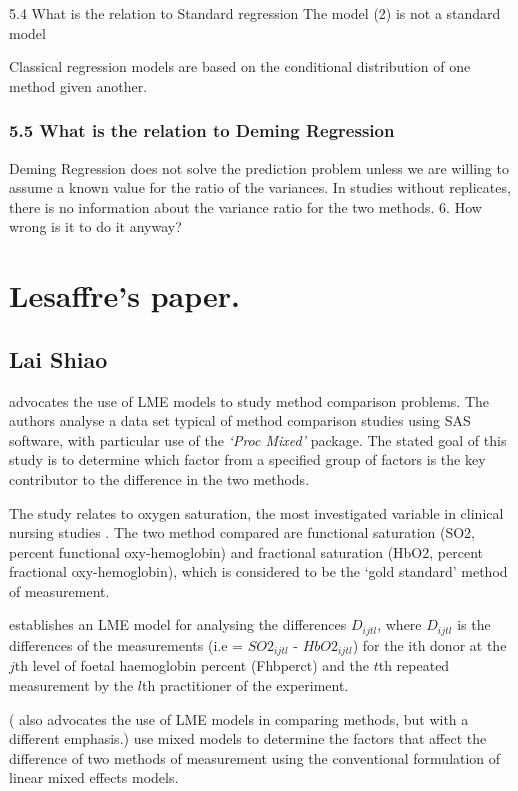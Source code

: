 \documentclass[12pt, a4paper]{report}
\theoremstyle{plain}
\theoremstyle{definition}
\theoremstyle{remark}
\begin{document}
5.4 What is the relation to Standard regression
The model (2) is not a standard model

Classical regression models are based on the conditional distribution of one method given another.
\subsection{5.5 What is the relation to Deming Regression}
Deming Regression does not solve the prediction problem
unless we are willing to assume a known value for the ratio of the variances.
In studies without replicates, there is no information about the variance ratio for the two methods.
6. How wrong is it to do it anyway?
	\chapter{Lesaffre's paper.}


	\section{Lai Shiao}
	
	\citet{LaiShiao} advocates the use of LME models to study method comparison problems. The authors analyse a data set typical of method comparison studies using SAS software, with particular use of the \emph{`Proc Mixed'} package. The stated goal of this study is to determine which factor from a specified group of factors is the key contributor to the difference in the two methods.
	
	The study relates to oxygen saturation, the most investigated variable in clinical nursing studies \citep{LaiShiao}. The two method compared are functional saturation (SO2, percent functional oxy-hemoglobin) and fractional saturation (HbO2, percent fractional oxy-hemoglobin), which is considered to be the `gold standard' method of measurement.
	
	\citet{LaiShiao} establishes an LME model for analysing the differences $D_{ijtl}$, where $D_{ijtl}$ is the differences of the measurements (i.e = $SO2_{ijtl}$ - $HbO2_{ijtl}$) for the ith donor at the $j$th level of foetal haemoglobin percent (Fhbperct) and the $t$th repeated measurement by the $l$th practitioner of the experiment.
	
	
	(\citet{BXC2004} also advocates the use of LME models in comparing methods, but with a different emphasis.)
	\citet{LaiShiao} use mixed models to determine the factors that
	affect the difference of two methods of measurement using the
	conventional formulation of linear mixed effects models.
	
\end{document}
